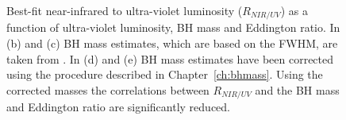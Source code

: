 \begin{figure}
\captionsetup[subfigure]{labelformat=empty}  
  \centering
  \subfloat[\label{fig:correlations_contour_a}]{}
  \subfloat[\label{fig:correlations_contour_b}]{}
  \subfloat[\label{fig:correlations_contour_c}]{}
  \subfloat[\label{fig:correlations_contour_d}]{}
  \subfloat[\label{fig:correlations_contour_e}]{}
  \caption[{Best-fit near-infrared to ultra-violet luminosity ($R_{NIR/UV}$) as a function of ultra-violet luminosity, BH mass and Eddington ratio.}]{Best-fit near-infrared to ultra-violet luminosity ($R_{NIR/UV}$) as a function of ultra-violet luminosity, BH mass and Eddington ratio. In (b) and (c) BH mass estimates, which are based on the  FWHM, are taken from \citet{shen11}. In (d) and (e) BH mass estimates have been corrected using the procedure described in Chapter~\ref{ch:bhmass}. Using the corrected masses the correlations between $R_{NIR/UV}$ and the BH mass and Eddington ratio are significantly reduced.}
  \label{fig:correlations_contour}
\end{figure}

